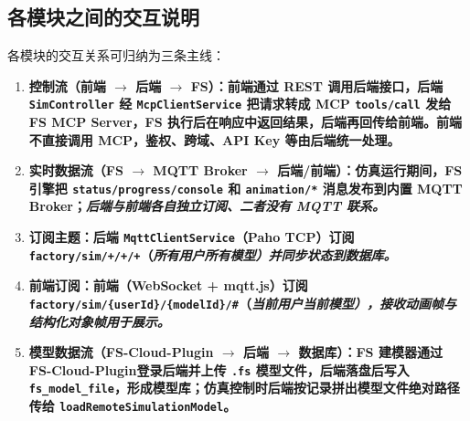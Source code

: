 \subsection{各模块之间的交互说明}
各模块的交互关系可归纳为三条主线：
\begin{enumerate}[label=\arabic*)]
	\item \bf{控制流（前端 $\rightarrow$ 后端 $\rightarrow$ FS）}：前端通过 REST 调用后端接口，后端 \texttt{SimController} 经 \texttt{McpClientService} 把请求转成 MCP \texttt{tools/call} 发给 FS MCP Server，FS 执行后在响应中返回结果，后端再回传给前端。\bf{前端不直接调用 MCP}，鉴权、跨域、API Key 等由后端统一处理。
	\item \bf{实时数据流（FS $\rightarrow$ MQTT Broker $\rightarrow$ 后端/前端）}：仿真运行期间，FS 引擎把 \texttt{status/progress/console} 和 \texttt{animation/*} 消息发布到内置 MQTT Broker；\it{后端与前端各自独立订阅、二者没有 MQTT 联系}。
	\item \bf{订阅主题}：后端 \texttt{MqttClientService}（Paho TCP）订阅 \texttt{factory/sim/+/+/+}（\it{所有用户所有模型}）并同步状态到数据库。
	\item \bf{前端订阅}：前端（WebSocket + mqtt.js）订阅 \texttt{factory/sim/\{userId\}/\{modelId\}/\#}（\it{当前用户当前模型}），接收动画帧与结构化对象帧用于展示。
	\item \bf{模型数据流（FS-Cloud-Plugin $\rightarrow$ 后端 $\rightarrow$ 数据库）}：FS 建模器通过 FS-Cloud-Plugin登录后端并上传 \texttt{.fs} 模型文件，后端落盘后写入 \texttt{fs\_model\_file}，形成模型库；仿真控制时后端按记录拼出模型文件绝对路径传给 \texttt{loadRemoteSimulationModel}。
\end{enumerate}

